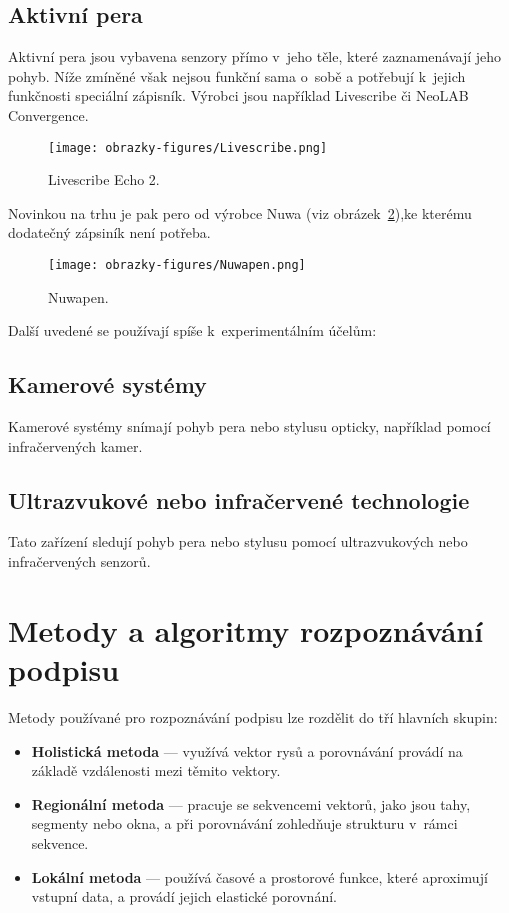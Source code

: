 \subsection*{Aktivní pera}
Aktivní pera jsou vybavena senzory přímo v~jeho těle, které zaznamenávají jeho pohyb.
Níže zmíněné však nejsou funkční sama o~sobě a potřebují k~jejich funkčnosti speciální zápisník. 
Výrobci jsou například Livescribe či NeoLAB Convergence.

\begin{figure}[H]
  \centering
  \texttt{[image: obrazky-figures/Livescribe.png]}
  \caption{Livescribe Echo 2.~\cite{livescribe_echo2}} 
  \label{fig:Livescribe}
\end{figure}
\newpage
\noindent
Novinkou na trhu je pak pero od výrobce Nuwa (viz obrázek~\ref{fig:Nuwapen}),ke kterému dodatečný zápsiník není potřeba.

\begin{figure}[H]
  \centering
  \texttt{[image: obrazky-figures/Nuwapen.png]}
  \caption{Nuwapen.~\cite{nuwapen}} 
  \label{fig:Nuwapen}
\end{figure}


\noindent
Další uvedené se používají spíše k~experimentálním účelům:

\subsection*{Kamerové systémy}
Kamerové systémy snímají pohyb pera nebo stylusu opticky, například pomocí infračervených kamer. 

\subsection*{Ultrazvukové nebo infračervené technologie}
Tato zařízení sledují pohyb pera nebo stylusu pomocí ultrazvukových nebo infračervených senzorů. 

\section{Metody a algoritmy rozpoznávání podpisu}
Metody používané pro rozpoznávání podpisu lze rozdělit do tří hlavních skupin:
\begin{itemize}
  \item \textbf{Holistická metoda} --- využívá vektor rysů a porovnávání provádí na základě vzdálenosti mezi těmito vektory.
  \item \textbf{Regionální metoda} --- pracuje se sekvencemi vektorů, jako jsou tahy, segmenty nebo okna, a při porovnávání zohledňuje strukturu v~rámci sekvence.
  \item \textbf{Lokální metoda} --- používá časové a prostorové funkce, které aproximují vstupní data, a provádí jejich elastické porovnání.~\cite{DrahanskýMartin2011}
\end{itemize}


